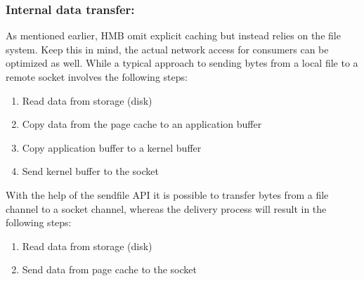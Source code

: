 \subsubsection{Internal data transfer:}

As mentioned earlier, HMB omit explicit caching but instead relies on the file system.
Keep this in mind, the actual network access for consumers can be optimized as well.
While a typical approach to sending bytes from a local file to a remote
socket involves the following steps: 
\begin{enumerate}
  \item Read data from storage (disk)
  \item Copy data from the page cache to an application buffer
  \item Copy application buffer to a kernel buffer
  \item Send kernel buffer to the socket
\end{enumerate}

With the help of the sendfile API  it is possible to 
transfer bytes from a file channel to a socket channel, whereas the delivery process will result in the following steps:

\begin{enumerate}
  \item Read data from storage (disk)
  \item Send data from page cache to the socket
\end{enumerate}


